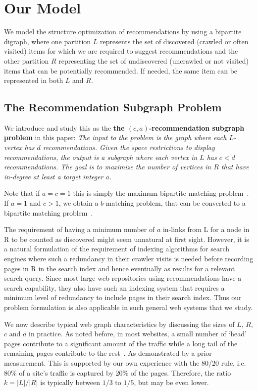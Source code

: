 \section{Our Model}

We model the structure optimization of recommendations by using a bipartite
digraph, where one partition $L$ represents the set of discovered (crawled or often visited) items for which
we are required to suggest recommendations and the other partition $R$
representing the set of undiscovered (uncrawled or not visited) items that can be potentially recommended. If
needed, the same item can be represented in both $L$ and $R$.
\vs

\subsection{The Recommendation Subgraph Problem}
We introduce and study this as the {\bf the $(c, a)$-recommendation subgraph problem} in this paper:
{\em
 The input to the problem is the graph where each
$L$-vertex has $d$ recommendations. Given the space restrictions to
display recommendations, the output is a subgraph where each vertex in
$L$ has $c < d$ recommendations. The goal is to maximize the number of
vertices in $R$ that have in-degree at least a target integer $a$.
}

\vs

Note that if $a=c=1$ this is simply the maximum bipartite
matching problem~\cite{LovaszPlummer1986}. If $a=1$ and $c > 1$, we
obtain a $b$-matching problem, that can be converted to a bipartite
matching problem~\cite{Gabow1983}.\vs

The requirement of having a minimum number of $a$ in-links from L for a node in R to be counted as discovered might seem unnatural at first sight. However, it is a natural formulation of the requirement of indexing algorithms for search engines where such a redundancy in their crawler visits is needed before recording pages in R in the search index and hence eventually as results for a relevant search query. Since most large web repositories using recommendations have a search capability, they also have such an indexing system that requires a minimum level of redundancy to include pages in their search index. Thus our problem formulation is also applicable in such general web systems that we study. \vs

We now describe typical web graph characteristics by discussing the
sizes of $L$, $R$, $c$ and $a$ in practice. As noted before, in most
websites, a small number of `head' pages contribute to a significant
amount of the traffic while a long tail of the remaining pages
contribute to the rest~\cite{HubermanAdamic1999,
  DuDemmerBrewer2006, KumarNorrisSun2009}. As demonstrated by a prior
measurement. This is supported by our
own experience with the 80/20 rule, i.e. 80\% of a site's traffic is
captured by 20\% of the pages. Therefore, the ratio $k=|L|/|R|$ is
typically between $1/3$ to $1/5$, but may be even lower. \vs

